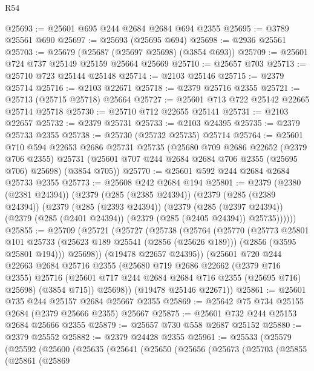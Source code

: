 \begin{lexlean}{R54}
\begin{coremodule}
@25693 := @25601 @695 @244 @2684 @2684 @694 @2355
@25695 := @3789 @25561 @690
@25697 := @25693 (@25695 @694)
@25698 := @2936 @25561
@25703 := @25679 (@25687 (@25697 @25698) (@3854 @693))
@25709 := @25601 @724 @737 @25149 @25159 @25664 @25669
@25710 := @25657 @703
@25713 := @25710 @723 @25144 @25148
@25714 := @2103 @25146
@25715 := @2379 @25714
@25716 := @2103 @22671
@25718 := @2379 @25716 @2355
@25721 := @25713 (@25715 @25718) @25664
@25727 := @25601 @713 @722 @25142 @22665 @25714 @25718
@25730 := @25710 @712 @22655 @25141
@25731 := @2103 @22657
@25732 := @2379 @25731
@25733 := @2103 @24395
@25735 := @2379 @25733 @2355
@25738 := @25730 (@25732 @25735) @25714
@25764 := @25601
    @710
    @594
    @22653
    @2686
    @25731
    @25735
    (@25680
      @709
      @2686
      @22652
      (@2379 @706 @2355)
      @25731
      (@25601 @707 @244 @2684 @2684 @706 @2355 (@25695 @706) @25698)
      (@3854 @705))
@25770 := @25601 @592 @244 @2684 @2684 @25733 @2355
@25773 := @25608 @242 @2684 @194
@25801 := @2379
    (@2380 (@2381 @24394))
    (@2379
      (@285 (@2385 @24394))
      (@2379
        (@285 (@2389 @24394))
        (@2379
          (@285 (@2393 @24394))
          (@2379
            (@285 (@2397 @24394))
            (@2379 (@285 (@2401 @24394)) (@2379 (@285 (@2405 @24394)) @25735))))))
@25855 := @25709
    (@25721
      (@25727
        (@25738
          (@25764
            (@25770
              (@25773
                @25801
                @101
                @25733
                (@25623 @189 @25541 (@2856 (@25626 @189)))
                (@2856 (@3595 @25801 @194)))
              @25698))
          (@19478 @22657 @24395))
        (@25601
          @720
          @244
          @22663
          @2684
          @25716
          @2355
          (@25680
            @719
            @2686
            @22662
            (@2379 @716 @2355)
            @25716
            (@25601 @717 @244 @2684 @2684 @716 @2355 (@25695 @716) @25698)
            (@3854 @715))
          @25698))
      (@19478 @25146 @22671))
@25861 := @25601 @735 @244 @25157 @2684 @25667 @2355
@25869 := @25642 @75 @734 @25155 @2684 (@2379 @25666 @2355) @25667
@25875 := @25601 @732 @244 @25153 @2684 @25666 @2355
@25879 := @25657 @730 @558 @2687 @25152
@25880 := @2379 @25552
@25882 := @2379 @24428 @2355
@25961 := @25533
    (@25579
      (@25592
        (@25600
          (@25635
            (@25641
              (@25650
                (@25656
                  (@25673
                    (@25703
                      (@25855
                        (@25861
                          (@25869

\end{coremodule}
\end{lexlean}
